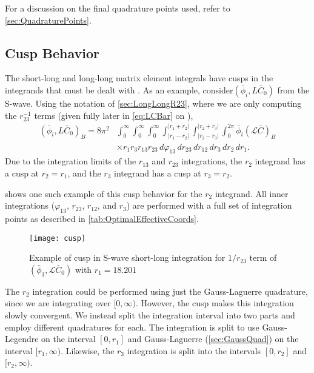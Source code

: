 \documentclass[Dissertation.tex]{subfiles}
\begin{document}

For a discussion on the final quadrature points used, refer to \cref{sec:QuadraturePoints}.


\subsection{Cusp Behavior}
\label{sec:Cusps}

The short-long and long-long matrix element integrals have cusps in the
integrands that must be dealt with \cite{VanReethThesis,Armour1991}.
As an example, consider$(\bar{\phi}_i, L\bar{C}_0)$ from the S-wave. Using the
notation of \cref{sec:LongLongR23}, where we are only computing the
$r_{23}^{-1}$ terms (given fully later in \cref{eq:LCBar} on \pageref{eq:LCBar}),
\begin{align}
(\bar{\phi}_i, L\bar{C}_0)_B = 8\pi^2 & \int_0^\infty \int_0^\infty \int_0^\infty \int_{|r_1 - r_2|}^{|r_1 + r_2|} \int_{|r_2 - r_3|}^{|r_2 + r_3|} \int_0^{2\pi} \bar{\phi}_i (\mathcal{L} \bar{C})_B  \nonumber \\
& \times r_1 r_3 r_{13} r_{23}\, d\varphi_{13}\, dr_{23}\, dr_{12}\, dr_3\, dr_2\, dr_1.
\end{align}
Due to the integration limits of the $r_{13}$ and $r_{23}$ integrations, the
$r_2$ integrand has a cusp at $r_2 = r_1$, and the $r_3$ integrand has a cusp
at $r_3 = r_2$.

 shows one such example of this cusp behavior for the $r_2$ 
integrand. All inner integrations ($\varphi_{13}$, $r_{23}$, $r_{12}$, and $r_3$)
are performed with a full set of integration points as described in
\cref{tab:OptimalEffectiveCoords}.

\begin{figure}
	\centering
	\texttt{[image: cusp]}
	\caption[Example of cusp in S-wave short-long integration]{Example of cusp
in S-wave short-long integration for $1/r_{23}$ term of
$(\bar{\phi}_3, \mathcal{L}\bar{C}_0)$ with \mbox{$r_1 = 18.201$}}
	\label{fig:cusp}
\end{figure}

The $r_2$ integration could be performed using just the Gauss-Laguerre 
quadrature, since we are integrating over $[0,\infty)$. However, the cusp 
makes this integration slowly convergent. We instead split the integration 
interval into two parts and employ different quadratures for each. The 
integration is split to use Gauss-Legendre on the 
interval $[0,r_1]$ and Gauss-Laguerre (\cref{sec:GaussQuad}) on the interval 
$[r_1,\infty)$. Likewise, the $r_3$ integration is split into the intervals
$[0,r_2]$ and $[r_2,\infty)$.
\end{document}

